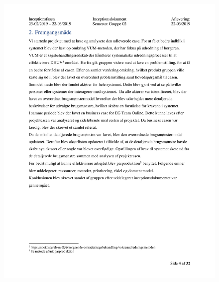 \begin{figure}[hb]
  \includegraphics[scale = 0.33]{./PNG/Inceptions/Gruppe 02 + InceptionsDokument-05.jpg} 
\end{figure}

